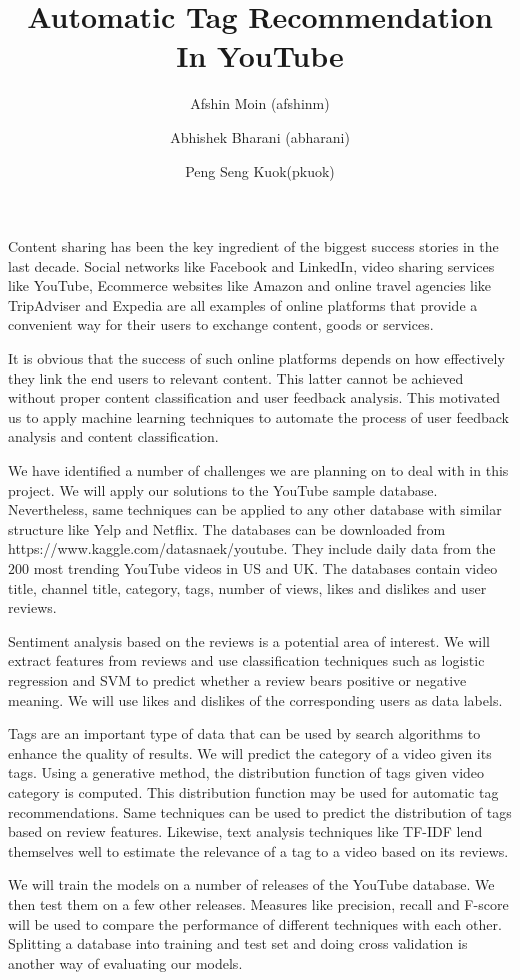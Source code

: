 \documentclass[11pt]{llncs}
\begin{document}
\pagestyle{empty} 

\title{Automatic Tag Recommendation In YouTube}
\author{Afshin Moin (afshinm)\institute{}
\and
Abhishek Bharani (abharani)\institute{}
\and 
Peng Seng Kuok(pkuok)\institute{}
}

\maketitle
Content sharing has been the key ingredient of the biggest success stories in the last decade. 
Social networks like Facebook and LinkedIn, video sharing services like YouTube, 
Ecommerce websites like Amazon and online travel agencies like TripAdviser and Expedia are all examples
of online platforms that provide a convenient way for their users to exchange content, goods or services. 

It is obvious that the success of such online platforms depends on how effectively they link the end users to relevant content.
This latter cannot be achieved without proper content classification and user feedback analysis.
This motivated us to apply machine learning techniques to automate the process of user feedback analysis and content classification.

We have identified a number of challenges we are planning on to deal with in this project.
We will apply our solutions to the YouTube sample database. 
Nevertheless, same techniques can be applied to any other database with similar structure like Yelp and Netflix.
The databases can be downloaded from https://www.kaggle.com/datasnaek/youtube. They include daily data
from the $200$ most trending YouTube videos in US and UK. The databases
contain video title, channel title, category, tags, number of views, likes and dislikes and user reviews.

Sentiment analysis based on the reviews is a potential area of interest. We will extract features from reviews and use classification techniques such as logistic regression and SVM to predict whether a review bears positive or negative meaning. We will use likes and dislikes of the corresponding users 
as data labels. 

Tags are an important type of data that can be used by search algorithms to enhance the quality of results. 
We will predict the category of a video given its tags. 
Using a generative method, the distribution function of tags given video category is computed. This distribution function may be used for automatic tag recommendations. Same techniques can be used to predict the distribution of tags based on review features.
Likewise, text analysis techniques like TF-IDF lend themselves well to estimate the relevance of a tag to a video based on its reviews.

We will train the models on a number of releases of the YouTube database. We then test them on a few other releases. Measures like precision, recall and F-score will be used to compare the performance of different techniques with each other. Splitting a database into training and test set and doing cross validation is another way of evaluating our models.
\end{document}
